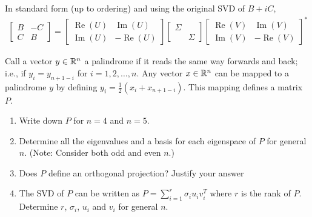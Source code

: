 \documentclass[10pt]{article}
\begin{document}
\begin{solution}[Solution]
In standard form (up to ordering) and using the original SVD of \( B+iC \),
\begin{align*}
    \left[\begin{array}{cc}B & -C \\ C & B\end{array}\right]
    = \left[\begin{array}{cc}\operatorname{Re}(U) & \operatorname{Im}(U) \\ \operatorname{Im}(U) & -\operatorname{Re}(U)\end{array}\right]
    \left[\begin{array}{cc}\Sigma \\ & \Sigma\end{array}\right]\left[\begin{array}{cc}\operatorname{Re}(V) & \operatorname{Im}(V) \\ \operatorname{Im}(V) & -\operatorname{Re}(V) \end{array}\right]^*
\end{align*}

\end{solution}

\begin{problem}
Call a vector \( y\in \mathbb{R}^n \) a palindrome if it reads the same way forwards and back; i.e., if \( y_i = y_{n+1-i} \) for \( i=1,2,\ldots, n \). Any vector \( x\in\mathbb{R}^n \) can be mapped to a palindrome \( y \) by
defining \( y_i = \frac{1}{2}(x_i+x_{n+1-i}) \). This mapping defines a matrix \( P \).
\begin{enumerate}[label=(\alph*), nolistsep]
    \item Write down \( P \) for \( n=4 \) and \( n=5 \).
    \item Determine all the eigenvalues and a basis for each eigenspace of \( P \) for general \( n \). (Note: Consider both odd and even \( n \).)
    \item Does \( P \) define an orthogonal projection? Justify your answer
    \item The SVD of \( P \) can be written as \( P = \sum_{i=1}^{r} \sigma_iu_iv_i^T \) where \( r \) is the rank of \( P \). Determine \( r \), \( \sigma_i \), \( u_i \) and \( v_i \) for general \( n \).
\end{enumerate}
\end{problem}
\end{document}
